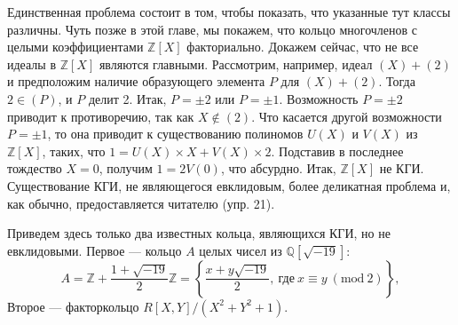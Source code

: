 \begin{myproof}
Единственная проблема состоит в том, чтобы показать, что  
указанные тут классы различны. Чуть позже в этой главе, мы покажем, 
что кольцо многочленов с целыми коэффициентами $\mathbb{Z}[X]$  
факториально. Докажем сейчас, что не все идеалы в $\mathbb{Z}[X]$ являются  
главными. Рассмотрим, например, идеал $(X) + (2)$ и предположим наличие 
образующего элемента $P$ для $(X) + (2)$. Тогда $2 \in (P)$, и $P$ делит 2. 
Итак, $P = ±2$ или $P = ±1$. Возможность $P = ±2$ приводит к 
противоречию, так как $X \notin (2)$. Что касается другой  
возможности $P = ±1$, то она приводит к существованию полиномов $U(X)$ 
и $V(X)$ из $\mathbb{Z}[X]$, таких, что $1 = U(X) \times X + V(X) \times 2$. Подставив 
в последнее тождество $X = 0$, получим $1 = 2V(0)$, что абсурдно. 
Итак, $\mathbb{Z}[X]$ не КГИ. Существование КГИ, не являющегося  
евклидовым, более деликатная проблема и, как обычно, предоставляется 
читателю (упр. 21).

\noindent Приведем здесь только два известных кольца, являющихся КГИ, но 
не евклидовыми. Первое — кольцо $A$ целых чисел из $\mathbb{Q}[\sqrt{-19}]$:
\begin{equation*}
A = \mathbb{Z} + \frac{1 + \sqrt{-19}}{2}\mathbb{Z} = \left\{{\frac{x+y\sqrt{-19}}{2},\: \text{где}\: x \equiv y\: (\text{mod}\: 2)}\right\},
\end{equation*} 
Второе — факторкольцо $R[X, Y]\slash(X^2 + Y^2 + 1)$. 
\end{myproof}

